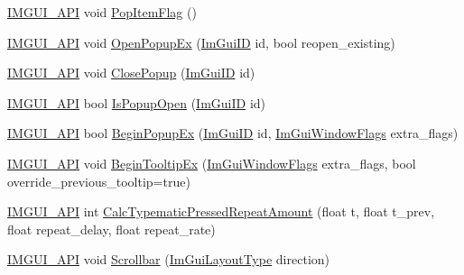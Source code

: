 \begin{DoxyCompactItemize}
\item 
\mbox{\hyperlink{imgui_8h_a43829975e84e45d1149597467a14bbf5}{I\+M\+G\+U\+I\+\_\+\+A\+PI}} void \mbox{\hyperlink{namespace_im_gui_aa93281155e1dd23715dbd384e91edc6b}{Pop\+Item\+Flag}} ()
\item 
\mbox{\hyperlink{imgui_8h_a43829975e84e45d1149597467a14bbf5}{I\+M\+G\+U\+I\+\_\+\+A\+PI}} void \mbox{\hyperlink{namespace_im_gui_a92683a696319581577334d6b798e2f97}{Open\+Popup\+Ex}} (\mbox{\hyperlink{imgui_8h_a1785c9b6f4e16406764a85f32582236f}{Im\+Gui\+ID}} id, bool reopen\+\_\+existing)
\item 
\mbox{\hyperlink{imgui_8h_a43829975e84e45d1149597467a14bbf5}{I\+M\+G\+U\+I\+\_\+\+A\+PI}} void \mbox{\hyperlink{namespace_im_gui_a7f3f82fc44d67af554faf104b913ea55}{Close\+Popup}} (\mbox{\hyperlink{imgui_8h_a1785c9b6f4e16406764a85f32582236f}{Im\+Gui\+ID}} id)
\item 
\mbox{\hyperlink{imgui_8h_a43829975e84e45d1149597467a14bbf5}{I\+M\+G\+U\+I\+\_\+\+A\+PI}} bool \mbox{\hyperlink{namespace_im_gui_ae747d8e0c6ff9c24535e9d07e9350397}{Is\+Popup\+Open}} (\mbox{\hyperlink{imgui_8h_a1785c9b6f4e16406764a85f32582236f}{Im\+Gui\+ID}} id)
\item 
\mbox{\hyperlink{imgui_8h_a43829975e84e45d1149597467a14bbf5}{I\+M\+G\+U\+I\+\_\+\+A\+PI}} bool \mbox{\hyperlink{namespace_im_gui_a89da3a22300e8293257b6cfdf1b83b7a}{Begin\+Popup\+Ex}} (\mbox{\hyperlink{imgui_8h_a1785c9b6f4e16406764a85f32582236f}{Im\+Gui\+ID}} id, \mbox{\hyperlink{imgui_8h_a0b8e067ab4f7a818828c8d89e531addc}{Im\+Gui\+Window\+Flags}} extra\+\_\+flags)
\item 
\mbox{\hyperlink{imgui_8h_a43829975e84e45d1149597467a14bbf5}{I\+M\+G\+U\+I\+\_\+\+A\+PI}} void \mbox{\hyperlink{namespace_im_gui_a3189530b7795a9b99169eb95f36c516d}{Begin\+Tooltip\+Ex}} (\mbox{\hyperlink{imgui_8h_a0b8e067ab4f7a818828c8d89e531addc}{Im\+Gui\+Window\+Flags}} extra\+\_\+flags, bool override\+\_\+previous\+\_\+tooltip=true)
\item 
\mbox{\hyperlink{imgui_8h_a43829975e84e45d1149597467a14bbf5}{I\+M\+G\+U\+I\+\_\+\+A\+PI}} int \mbox{\hyperlink{namespace_im_gui_ad3af0fc327467a44116d7d04018b9124}{Calc\+Typematic\+Pressed\+Repeat\+Amount}} (float t, float t\+\_\+prev, float repeat\+\_\+delay, float repeat\+\_\+rate)
\item 
\mbox{\hyperlink{imgui_8h_a43829975e84e45d1149597467a14bbf5}{I\+M\+G\+U\+I\+\_\+\+A\+PI}} void \mbox{\hyperlink{namespace_im_gui_abf1d7a83c5f0a555bbe7f831b0319c8a}{Scrollbar}} (\mbox{\hyperlink{imgui__internal_8h_a86d7bb2ee8297d38b131d8ea7e6430c6}{Im\+Gui\+Layout\+Type}} direction)

\end{DoxyCompactItemize}

